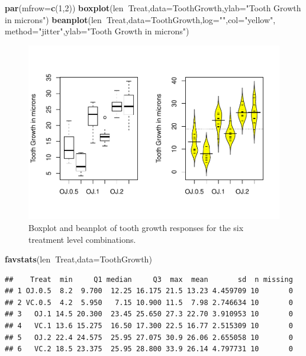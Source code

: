 \documentclass[]{book}
\newenvironment{Shaded}{\begin{snugshade}}{\end{snugshade}}
\newcommand{\KeywordTok}[1]{\textcolor[rgb]{0.13,0.29,0.53}{\textbf{#1}}}
\newcommand{\DataTypeTok}[1]{\textcolor[rgb]{0.13,0.29,0.53}{#1}}
\newcommand{\DecValTok}[1]{\textcolor[rgb]{0.00,0.00,0.81}{#1}}
\newcommand{\StringTok}[1]{\textcolor[rgb]{0.31,0.60,0.02}{#1}}
\newcommand{\OperatorTok}[1]{\textcolor[rgb]{0.81,0.36,0.00}{\textbf{#1}}}
\newcommand{\NormalTok}[1]{#1}
\begin{document}
\begin{Shaded}
\begin{Highlighting}[]
\KeywordTok{par}\NormalTok{(}\DataTypeTok{mfrow=}\KeywordTok{c}\NormalTok{(}\DecValTok{1}\NormalTok{,}\DecValTok{2}\NormalTok{))}
\KeywordTok{boxplot}\NormalTok{(len}\OperatorTok{~}\NormalTok{Treat,}\DataTypeTok{data=}\NormalTok{ToothGrowth,}\DataTypeTok{ylab=}\StringTok{"Tooth Growth in microns"}\NormalTok{)}
\KeywordTok{beanplot}\NormalTok{(len}\OperatorTok{~}\NormalTok{Treat,}\DataTypeTok{data=}\NormalTok{ToothGrowth,}\DataTypeTok{log=}\StringTok{""}\NormalTok{,}\DataTypeTok{col=}\StringTok{"yellow"}\NormalTok{,}
         \DataTypeTok{method=}\StringTok{"jitter"}\NormalTok{,}\DataTypeTok{ylab=}\StringTok{"Tooth Growth in microns"}\NormalTok{)}
\end{Highlighting}
\end{Shaded}

\begin{figure}
\centering
\includegraphics{GreenwoodBanner_files/figure-latex/Figure3-14-1.pdf}
\caption{\label{fig:Figure3-14}Boxplot and beanplot of tooth growth responses for the six
treatment level combinations.}
\end{figure}

\begin{Shaded}
\begin{Highlighting}[]
\KeywordTok{favstats}\NormalTok{(len}\OperatorTok{~}\NormalTok{Treat,}\DataTypeTok{data=}\NormalTok{ToothGrowth)}
\end{Highlighting}
\end{Shaded}

\begin{verbatim}
##    Treat  min     Q1 median     Q3  max  mean       sd  n missing
## 1 OJ.0.5  8.2  9.700  12.25 16.175 21.5 13.23 4.459709 10       0
## 2 VC.0.5  4.2  5.950   7.15 10.900 11.5  7.98 2.746634 10       0
## 3   OJ.1 14.5 20.300  23.45 25.650 27.3 22.70 3.910953 10       0
## 4   VC.1 13.6 15.275  16.50 17.300 22.5 16.77 2.515309 10       0
## 5   OJ.2 22.4 24.575  25.95 27.075 30.9 26.06 2.655058 10       0
## 6   VC.2 18.5 23.375  25.95 28.800 33.9 26.14 4.797731 10       0
\end{verbatim}
\end{document}

